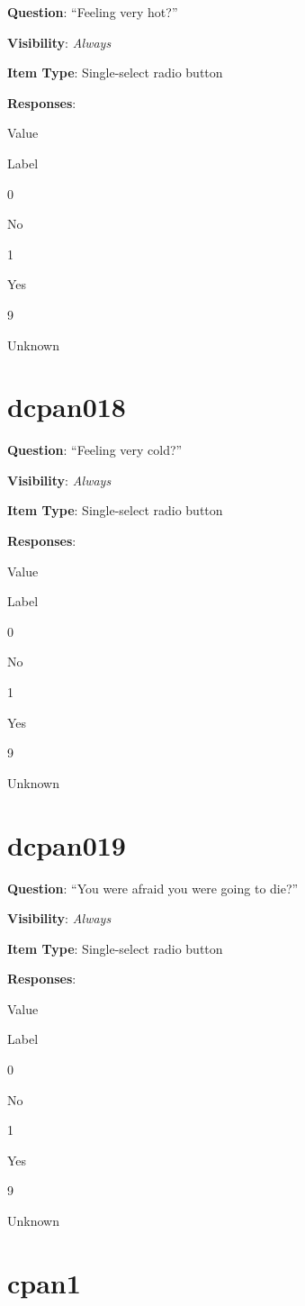 \documentclass[]{book}
\begin{document}
\textbf{Question}: ``Feeling very hot?''

\textbf{Visibility}: \emph{Always}

\textbf{Item Type}: Single-select radio button

\textbf{Responses}:

Value

Label

0

No

1

Yes

9

Unknown

\hypertarget{dcpan018}{%
\section{dcpan018}\label{dcpan018}}

\textbf{Question}: ``Feeling very cold?''

\textbf{Visibility}: \emph{Always}

\textbf{Item Type}: Single-select radio button

\textbf{Responses}:

Value

Label

0

No

1

Yes

9

Unknown

\hypertarget{dcpan019}{%
\section{dcpan019}\label{dcpan019}}

\textbf{Question}: ``You were afraid you were going to die?''

\textbf{Visibility}: \emph{Always}

\textbf{Item Type}: Single-select radio button

\textbf{Responses}:

Value

Label

0

No

1

Yes

9

Unknown

\hypertarget{cpan1}{%
\section{cpan1}\label{cpan1}}
\end{document}
